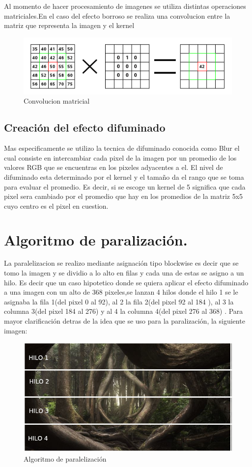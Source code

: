\documentclass{IEEEtran}
\begin{document}
Al momento de hacer procesamiento de imagenes se utiliza distintas operaciones matriciales.En el caso del efecto borroso se realiza una convolucion entre la matriz que representa la imagen y el kernel

\begin{figure}[H]
  \includegraphics[width=\linewidth]{matriz.png}
  \caption{Convolucion matricial}
  \label{fig:boat1}
\end{figure}
\subsection{Creación del efecto difuminado}

Mas especificamente se utilizo la tecnica de difuminado conocida como Blur el cual consiste en intercambiar cada pixel de la imagen por un promedio de los valores RGB que se encuentras en los pixeles adyacentes a el. El nivel de difuminado esta determinado por el kernel y el tamaño da el rango que se toma para evaluar el promedio. Es decir, si se escoge un kernel de 5 significa que cada pixel sera cambiado por el promedio que hay en los promedios de la matriz 5x5 cuyo centro es el pixel en cuestion.

\section{Algoritmo de paralización.}
La paralelizacion se realizo mediante asignación tipo blockwise es decir que se tomo la imagen y se dividio a lo alto en filas y cada una de estas se asigno a un hilo. Es decir que un caso hipotetico donde se quiera aplicar el efecto difuminado a una imagen con un alto de 368 pixeles,se  lanzan 4 hilos donde el hilo 1 se le asignaba la fila 1(del pixel 0 al 92), al 2 la fila 2(del pixel 92 al 184 ), al 3 la columna 3(del pixel 184 al 276)  y al 4 la  columna 4(del pixel 276 al 368) . Para mayor clarificación detras de la idea que se uso para la paralización, la siguiente imagen:

\begin{figure}[H]
  \includegraphics[width=\linewidth]{mod.jpg}
  \caption{Algoritmo de paralelización}
  \label{fig:boat2}
\end{figure}
\end{document}
